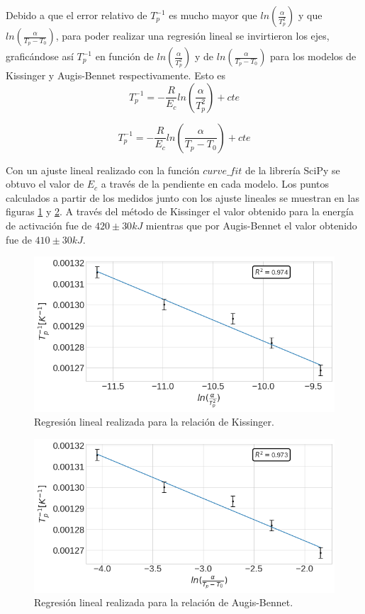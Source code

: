 \documentclass[12pt]{article}
\theoremstyle{definition}
\theoremstyle{remark}
\begin{document}
{Debido a que el error relativo de $T_p^{-1}$ es mucho mayor que $ln(\frac{\alpha}{T_p^2})$ y que $ln(\frac{\alpha}{T_p-T_0})$, para poder realizar una regresión lineal se invirtieron los ejes, graficándose así $T_p^{-1}$ en función de $ln(\frac{\alpha}{T_p^2})$ y de $ln(\frac{\alpha}{T_p-T_0})$ para los modelos de Kissinger y Augis-Bennet respectivamente. Esto es
\begin{equation}
	T_p^{-1}=-\frac{R}{E_c}ln(\frac{\alpha}{T_p^2})+cte
\end{equation}

\begin{equation}
	T_p^{-1}=-\frac{R}{E_c}ln(\frac{\alpha}{T_p-T_0})+cte
\end{equation}

Con un ajuste lineal realizado con la función $curve\_fit$ de la librería SciPy se obtuvo el valor de $E_c$ a través de la pendiente en cada modelo. Los puntos calculados a partir de los medidos junto con los ajuste lineales se muestran en las figuras \ref{Kiss} y \ref{AugBen}. A través del método de Kissinger el valor obtenido para la energía de activación fue de $420 \pm 30 kJ$ mientras que por Augis-Bennet el valor obtenido fue de $410 \pm 30 kJ$.


\begin{figure}[H]
 	\centering
	\includegraphics[scale=0.4]{img/Kissinger.png}
 	\caption{Regresión lineal realizada para la relación de Kissinger.}
	\label{Kiss}
\end{figure} 

 \begin{figure}[H]
 	\centering
	\includegraphics[scale=0.4]{img/Augis_bennet.png}
 	\caption{Regresión lineal realizada para la relación de Augis-Bennet.}
	\label{AugBen}
\end{figure} 

}
\end{document}
